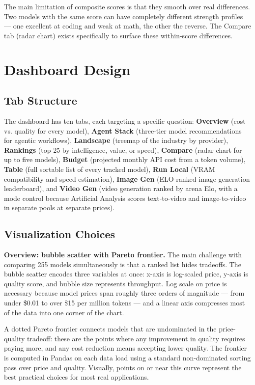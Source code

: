 \documentclass{article}
\begin{document}
The main limitation of composite scores is that they smooth over real
differences. Two models with the same score can have completely different
strength profiles --- one excellent at coding and weak at math, the other the
reverse. The Compare tab (radar chart) exists specifically to surface these
within-score differences.

\section{Dashboard Design}

\subsection{Tab Structure}

The dashboard has ten tabs, each targeting a specific question:
\textbf{Overview} (cost vs. quality for every model),
\textbf{Agent Stack} (three-tier model recommendations for agentic workflows),
\textbf{Landscape} (treemap of the industry by provider),
\textbf{Rankings} (top 25 by intelligence, value, or speed),
\textbf{Compare} (radar chart for up to five models),
\textbf{Budget} (projected monthly API cost from a token volume),
\textbf{Table} (full sortable list of every tracked model),
\textbf{Run Local} (VRAM compatibility and speed estimation),
\textbf{Image Gen} (ELO-ranked image generation leaderboard),
and \textbf{Video Gen} (video generation ranked by arena Elo, with a mode
control because Artificial Analysis scores text-to-video and image-to-video in
separate pools at separate prices).

\subsection{Visualization Choices}

\textbf{Overview: bubble scatter with Pareto frontier.}
The main challenge with comparing 255 models simultaneously is that a ranked
list hides tradeoffs. The bubble scatter encodes three variables at once:
x-axis is log-scaled price, y-axis is quality score, and bubble size
represents throughput. Log scale on price is necessary because model prices
span roughly three orders of magnitude --- from under \$0.01 to over \$15 per
million tokens --- and a linear axis compresses most of the data into one
corner of the chart.

A dotted Pareto frontier connects models that are undominated in the
price-quality tradeoff: these are the points where any improvement in quality
requires paying more, and any cost reduction means accepting lower quality.
The frontier is computed in Pandas on each data load using a standard
non-dominated sorting pass over price and quality. Visually, points on or
near this curve represent the best practical choices for most real
applications.
\end{document}
